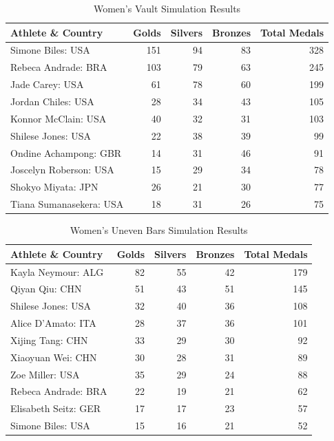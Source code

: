 \documentclass[
  10.5pt,
  letterpaper,
  DIV=11,
  numbers=noendperiod]{scrartcl}
\begin{document}
\begin{table}[H]

\caption{Women's Vault Simulation Results }
\centering
\fontsize{8}{10}\selectfont
\begin{tabular}[t]{l|r|r|r|r}
\hline
Athlete \& Country & Golds & Silvers & Bronzes & Total Medals\\
\hline
Simone Biles: USA & 151 & 94 & 83 & 328\\
\hline
Rebeca Andrade: BRA & 103 & 79 & 63 & 245\\
\hline
Jade Carey: USA & 61 & 78 & 60 & 199\\
\hline
Jordan Chiles: USA & 28 & 34 & 43 & 105\\
\hline
Konnor McClain: USA & 40 & 32 & 31 & 103\\
\hline
Shilese Jones: USA & 22 & 38 & 39 & 99\\
\hline
Ondine Achampong: GBR & 14 & 31 & 46 & 91\\
\hline
Joscelyn Roberson: USA & 15 & 29 & 34 & 78\\
\hline
Shokyo Miyata: JPN & 26 & 21 & 30 & 77\\
\hline
Tiana Sumanasekera: USA & 18 & 31 & 26 & 75\\
\hline
\end{tabular}
\end{table}

\begin{table}[H]

\caption{Women's Uneven Bars Simulation Results }
\centering
\fontsize{9}{11}\selectfont
\begin{tabular}[t]{l|r|r|r|r}
\hline
Athlete \& Country & Golds & Silvers & Bronzes & Total Medals\\
\hline
Kayla Neymour: ALG & 82 & 55 & 42 & 179\\
\hline
Qiyan Qiu: CHN & 51 & 43 & 51 & 145\\
\hline
Shilese Jones: USA & 32 & 40 & 36 & 108\\
\hline
Alice D'Amato: ITA & 28 & 37 & 36 & 101\\
\hline
Xijing Tang: CHN & 33 & 29 & 30 & 92\\
\hline
Xiaoyuan Wei: CHN & 30 & 28 & 31 & 89\\
\hline
Zoe Miller: USA & 35 & 29 & 24 & 88\\
\hline
Rebeca Andrade: BRA & 22 & 19 & 21 & 62\\
\hline
Elisabeth Seitz: GER & 17 & 17 & 23 & 57\\
\hline
Simone Biles: USA & 15 & 16 & 21 & 52\\
\hline
\end{tabular}
\end{table}
\end{document}
